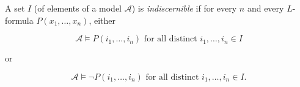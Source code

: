 A set $I$ (of elements of a model $\mathcal{A}$) is \textit{indiscernible} if for every $n$ and every $L$-formula $P(x_1, \ldots, x_n)$, either

$$\mathcal{A} \models P(i_1, \ldots, i_n) \text{ for all distinct } i_1, \ldots, i_n \in I$$

or

$$\mathcal{A} \models \neg P(i_1, \ldots, i_n) \text{ for all distinct } i_1, \ldots, i_n \in I.$$
